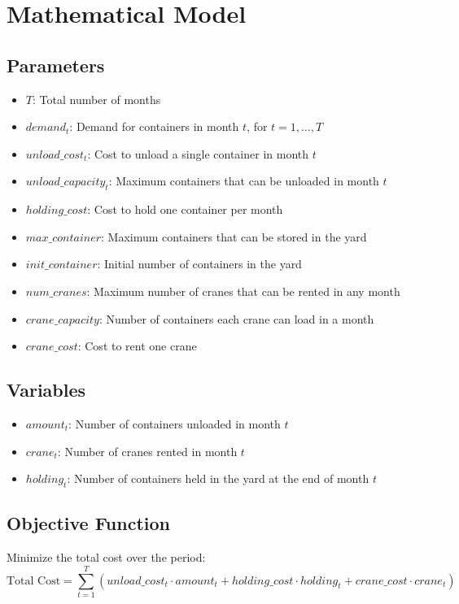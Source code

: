 \documentclass{article}
\begin{document}
\section*{Mathematical Model}

\subsection*{Parameters}
\begin{itemize}
    \item $T$: Total number of months
    \item $demand_{t}$: Demand for containers in month $t$, for $t = 1, \ldots, T$
    \item $unload\_cost_{t}$: Cost to unload a single container in month $t$
    \item $unload\_capacity_{t}$: Maximum containers that can be unloaded in month $t$
    \item $holding\_cost$: Cost to hold one container per month
    \item $max\_container$: Maximum containers that can be stored in the yard
    \item $init\_container$: Initial number of containers in the yard
    \item $num\_cranes$: Maximum number of cranes that can be rented in any month
    \item $crane\_capacity$: Number of containers each crane can load in a month
    \item $crane\_cost$: Cost to rent one crane
\end{itemize}

\subsection*{Variables}
\begin{itemize}
    \item $amount_{t}$: Number of containers unloaded in month $t$
    \item $crane_{t}$: Number of cranes rented in month $t$
    \item $holding_{t}$: Number of containers held in the yard at the end of month $t$
\end{itemize}

\subsection*{Objective Function}
Minimize the total cost over the period:
\[
\text{Total Cost} = \sum_{t=1}^{T} \left( unload\_cost_{t} \cdot amount_{t} + holding\_cost \cdot holding_{t} + crane\_cost \cdot crane_{t} \right)
\]
\end{document}
